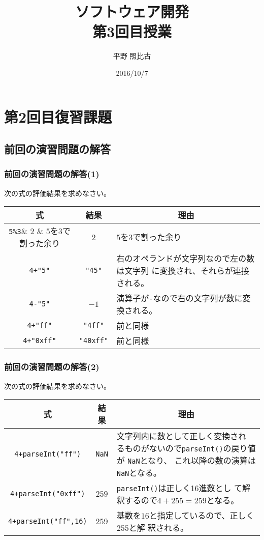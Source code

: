 %

\title{ソフトウェア開発\\第3回目授業}
\author{平野 照比古}
\institute{}
\date{2016/10/7}

\frame{\maketitle}
\section{第2回目復習課題}
\subsection{前回の演習問題の解答}
\newcommand{\Rule}{\iffalse\rule[-2ex]{0em}{5ex}\fi}
\begin{frame}[containsverbatim]
\frametitle{前回の演習問題の解答(1)}
次の式の評価結果を求めなさい。
\begin{center}
 \begin{tabular}{|>{\Rule}c|c|m{}|}\hline
  \multicolumn{1}{|c|}{式}&\multicolumn{1}{c|}{結果} &\multicolumn{1}{c|}{理由} \\\hline
  \Verb+5%
  \Verb-4+"5"-& \Verb+"45"+& 右のオペランドが文字列なので左の数は文字列
    に変換され、それらが連接される。\\ \hline
  \Verb+4-"5"+& $-1$& 演算子が\Verb+-+なので右の文字列が数に変換される。\\ \hline
  \Verb-4+"ff"-&\Verb+"4ff"+ & 前と同様\\ \hline
  \Verb-4+"0xff"-& \Verb+"40xff"+& 前と同様\\ \hline
 \end{tabular}
\end{center}
\end{frame}
\begin{frame}[containsverbatim]
\frametitle{前回の演習問題の解答(2)}
次の式の評価結果を求めなさい。
\begin{center}
 \begin{tabular}{|>{\Rule}c|c|m{}|}\hline
  \multicolumn{1}{|c|}{式}&\multicolumn{1}{c|}{結果} &\multicolumn{1}{c|}{理由} \\\hline
  \Verb-4+parseInt("ff")-& \Verb+NaN+& 文字列内に数として正しく変換され
    るものがないので\Verb+parseInt()+の戻り値が \Verb-NaN-となり、
    これ以降の数の演算は\Verb+NaN+となる。\\ \hline
  \Verb-4+parseInt("0xff")-& $259$& \Verb+parseInt()+は正しく16進数とし
    て解釈するので$4+255=259$となる。\\ \hline
  \Verb-4+parseInt("ff",16)-& $259$& 基数を$16$と指定しているので、正しく$255$と解
    釈される。\\ \hline
 \end{tabular}
\end{center}
\end{frame}
